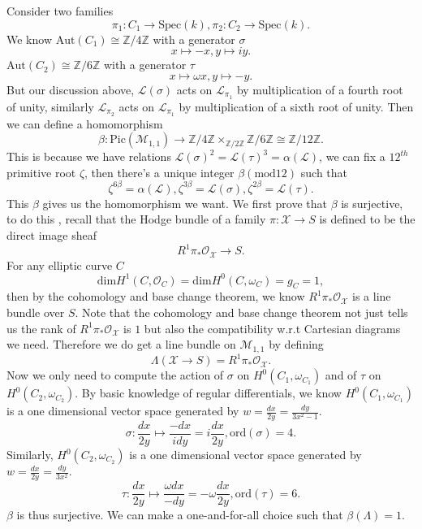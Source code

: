 \documentclass[main.tex]{subfiles}
\begin{document}
\begin{example}
Consider two families 
$$\pi_{1}: C_{1}\rightarrow \mathrm{Spec}(k), \pi_{2}: C_{2}\rightarrow \mathrm{Spec}(k).$$
We know $\mathrm{Aut}(C_{1})\cong \mathbb{Z}/4\mathbb{Z}$ with a generator $\sigma$
$$x\mapsto -x, y\mapsto iy.$$
$\mathrm{Aut}(C_{2})\cong \mathbb{Z}/6\mathbb{Z}$ with a generator $\tau$
$$x\mapsto \omega x, y\mapsto -y.$$
But our discussion above, $\mathscr{L}(\sigma)$ acts on $\mathscr{L}_{\pi_{1}}$ by multiplication of a fourth root of unity, similarly $\mathscr{L}_{\pi_{2}}$ acts on $\mathscr{L}_{\pi_{1}}$ by multiplication of a sixth root of unity. Then we can define a homomorphism
$$\beta:\mathrm{Pic}(\mathscr{M}_{1,1})\rightarrow \mathbb{Z}/4\mathbb{Z}\times_{\mathbb{Z}/2\mathbb{Z}}\mathbb{Z}/6\mathbb{Z}\cong \mathbb{Z}/12\mathbb{Z}.$$
This is because we have relations $\mathscr{L}(\sigma)^{2}=\mathscr{L}(\tau)^{3}=\alpha(\mathscr{L})$, we can fix a $12^{th}$ primitive root $\zeta$, then there's a unique integer $\beta (\mathrm{mod} 12)$ such that
$$\zeta^{6\beta}=\alpha(\mathscr{L}), \zeta^{3\beta}=\mathscr{L}(\sigma), \zeta^{2\beta}=\mathscr{L}(\tau).$$
This $\beta$ gives us the homomorphism we want. We first prove that $\beta$ is surjective, to do this , recall that the Hodge bundle of a family $\pi:\mathscr{X}\rightarrow S$ is defined to be the direct image sheaf
$$R^{1}\pi_{*}\mathcal{O}_{\mathscr{X}}\rightarrow S.$$
For any elliptic curve $C$
$$\mathrm{dim}H^{1}(C, \mathcal{O}_{C})=\mathrm{dim} H^{0}(C, \omega_{C})=g_{C}=1,$$
then by the cohomology and base change theorem, we know $R^{1}\pi_{*}\mathcal{O}_{\mathscr{X}}$ is a line bundle over $S$. Note that the cohomology and base change theorem not just tells us the rank of $R^{1}\pi_{*}\mathcal{O}_{\mathscr{X}}$ is $1$ but also the compatibility w.r.t Cartesian diagrams we need. Therefore we do get a line bundle on $\mathscr{M}_{1,1}$ by defining 
$$\Lambda(\mathscr{X}\rightarrow S)=R^{1}\pi_{*}\mathcal{O}_{\mathscr{X}}.$$
Now we only need to compute the action of $\sigma$ on $H^{0}(C_{1}, \omega_{C_{1}})$ and of $\tau$ on $H^{0}(C_{2}, \omega_{C_{2}})$. By basic knowledge of regular differentials, we know $H^{0}(C_{1}, \omega_{C_{1}})$ is a one dimensional vector space generated by $w=\frac{dx}{2y}=\frac{dy}{3x^{2}-1}.$
$$\sigma: \frac{dx}{2y}\mapsto \frac{-dx}{idy}=i\frac{dx}{2y}, \mathrm{ord}(\sigma)=4.$$
Similarly, $H^{0}(C_{2}, \omega_{C_{2}})$ is a one dimensional vector space generated by $w=\frac{dx}{2y}=\frac{dy}{3x^{2}}.$ 
$$\tau: \frac{dx}{2y}\mapsto \frac{\omega dx}{-dy}=-\omega\frac{dx}{2y}, \mathrm{ord}(\tau)=6.$$
$\beta$ is thus surjective. We can make a one-and-for-all choice such that $\beta(\Lambda)=1$. 

\end{example}
\end{document}
